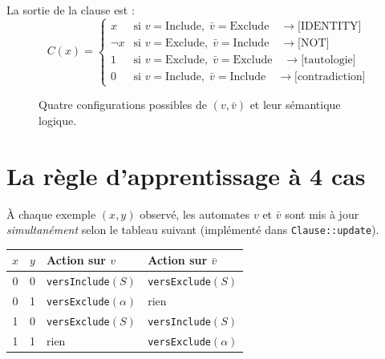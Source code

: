\documentclass[12pt,a4paper]{article}
\theoremstyle{remark}
\newcommand{\Inc}{\ensuremath{\mathrm{Include}}}
\newcommand{\Exc}{\ensuremath{\mathrm{Exclude}}}
\newcommand{\vbar}{\bar{v}}
\begin{document}
La sortie de la clause est :
\[
  C(x) = \begin{cases}
    x     & \text{si } v = \Inc,\;\vbar = \Exc \quad \longrightarrow \text{[IDENTITY]} \\
    \neg x & \text{si } v = \Exc,\;\vbar = \Inc \quad \longrightarrow \text{[NOT]}       \\
    1     & \text{si } v = \Exc,\;\vbar = \Exc \quad \longrightarrow \text{[tautologie]} \\
    0     & \text{si } v = \Inc,\;\vbar = \Inc \quad \longrightarrow \text{[contradiction]}
  \end{cases}
\]

\begin{figure}[h]
\centering
{}
\caption{Quatre configurations possibles de $(v, \vbar)$ et leur sémantique logique.}
\label{fig:config}
\end{figure}

\section{La règle d'apprentissage à 4 cas}

À chaque exemple $(x,y)$ observé, les automates $v$ et $\vbar$ sont mis à jour
\emph{simultanément} selon le tableau suivant (implémenté dans \texttt{Clause::update}).

\begin{center}
\begin{tabular}{ccll}
\toprule
$x$ & $y$ & Action sur $v$ & Action sur $\vbar$ \\
\midrule
0 & 0 & \texttt{versInclude}$(S)$ & \texttt{versExclude}$(S)$ \\
0 & 1 & \texttt{versExclude}$(\alpha)$ & rien \\
1 & 0 & \texttt{versExclude}$(S)$ & \texttt{versInclude}$(S)$ \\
1 & 1 & rien & \texttt{versExclude}$(\alpha)$ \\
\bottomrule
\end{tabular}
\end{center}
\end{document}

